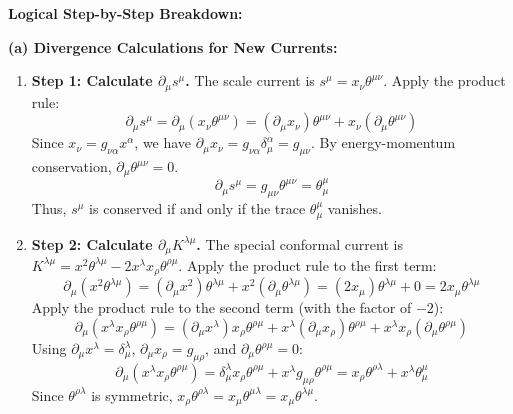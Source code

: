 \begin{solution}
\textbf{Logical Step-by-Step Breakdown:}

\textbf{(a) Divergence Calculations for New Currents:}
\begin{enumerate}
    \item \textbf{Step 1: Calculate $\partial_\mu s^\mu$.}
    The scale current is $s^\mu = x_\nu \theta^{\mu\nu}$. Apply the product rule:
    \[ \partial_\mu s^\mu = \partial_\mu (x_\nu \theta^{\mu\nu}) = (\partial_\mu x_\nu) \theta^{\mu\nu} + x_\nu (\partial_\mu \theta^{\mu\nu}) \]
    Since $x_\nu = g_{\nu\alpha} x^\alpha$, we have $\partial_\mu x_\nu = g_{\nu\alpha} \delta^\alpha_\mu = g_{\mu\nu}$.
    By energy-momentum conservation, $\partial_\mu \theta^{\mu\nu} = 0$.
    \[ \partial_\mu s^\mu = g_{\mu\nu} \theta^{\mu\nu} = \theta^\mu_\mu \]
    Thus, $s^\mu$ is conserved if and only if the trace $\theta^\mu_\mu$ vanishes.
    
    \item \textbf{Step 2: Calculate $\partial_\mu K^{\lambda\mu}$.}
    The special conformal current is $K^{\lambda\mu} = x^2 \theta^{\lambda\mu} - 2x^\lambda x_\rho \theta^{\rho\mu}$.
    Apply the product rule to the first term:
    \[ \partial_\mu (x^2 \theta^{\lambda\mu}) = (\partial_\mu x^2) \theta^{\lambda\mu} + x^2 (\partial_\mu \theta^{\lambda\mu}) = (2x_\mu) \theta^{\lambda\mu} + 0 = 2x_\mu \theta^{\lambda\mu} \]
    Apply the product rule to the second term (with the factor of $-2$):
    \[ \partial_\mu (x^\lambda x_\rho \theta^{\rho\mu}) = (\partial_\mu x^\lambda) x_\rho \theta^{\rho\mu} + x^\lambda (\partial_\mu x_\rho) \theta^{\rho\mu} + x^\lambda x_\rho (\partial_\mu \theta^{\rho\mu}) \]
    Using $\partial_\mu x^\lambda = \delta^\lambda_\mu$, $\partial_\mu x_\rho = g_{\mu\rho}$, and $\partial_\mu \theta^{\rho\mu} = 0$:
    \[ \partial_\mu (x^\lambda x_\rho \theta^{\rho\mu}) = \delta^\lambda_\mu x_\rho \theta^{\rho\mu} + x^\lambda g_{\mu\rho} \theta^{\rho\mu} = x_\rho \theta^{\rho\lambda} + x^\lambda \theta^\mu_\mu \]
    Since $\theta^{\rho\lambda}$ is symmetric, $x_\rho \theta^{\rho\lambda} = x_\mu \theta^{\mu\lambda} = x_\mu \theta^{\lambda\mu}$.
    

\end{enumerate}
\end{solution}

